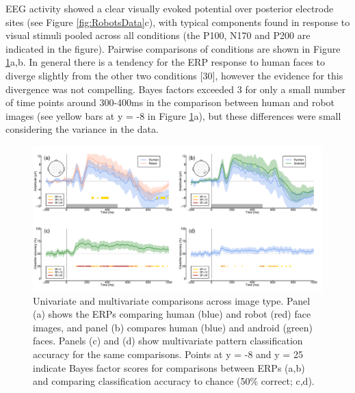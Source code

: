 \documentclass[
]{article}
\begin{document}
EEG activity showed a clear visually evoked potential over posterior electrode sites (see Figure \ref{fig:RobotsData}c), with typical components found in response to visual stimuli pooled across all conditions (the P100, N170 and P200 are indicated in the figure). Pairwise comparisons of conditions are shown in Figure \ref{fig:RobotsMVPA}a,b. In general there is a tendency for the ERP response to human faces to diverge slightly from the other two conditions {[}30{]}, however the evidence for this divergence was not compelling. Bayes factors exceeded 3 for only a small number of time points around 300-400ms in the comparison between human and robot images (see yellow bars at y = -8 in Figure \ref{fig:RobotsMVPA}a), but these differences were small considering the variance in the data.

\begin{figure}

{\centering \includegraphics{Figures/RobotsMVPA} 

}

\caption{Univariate and multivariate comparisons across image type. Panel (a) shows the ERPs comparing human (blue) and robot (red) face images, and panel (b) compares human (blue) and android (green) faces. Panels (c) and (d) show multivariate pattern classification accuracy for the same comparisons. Points at y = -8 and y = 25 indicate Bayes factor scores for comparisons between ERPs (a,b) and comparing classification accuracy to chance (50\% correct; c,d).}\label{fig:RobotsMVPA}
\end{figure}
\end{document}
